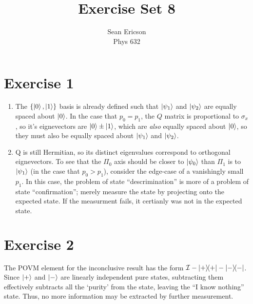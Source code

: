 \documentclass[12pt]{article}
\begin{document}
	
\title{Exercise Set 8}
\author{Sean Ericson \\ Phys 632}
\maketitle

\section*{Exercise 1}
\begin{enumerate}[label=(\alph*)]
    \item The $\{\ket{0}, \ket{1}\}$ basis is already defined such that $\ket{\psi_1}$ and $\ket{\psi_2}$ are equally spaced about $\ket{0}$. In the case that $p_0 = p_1$, the $Q$ matrix is proportional to $\sigma_x$, so it's eignevectors are $\ket{0}\pm\ket{1}$, which are \textit{also} equally spaced about $\ket{0}$, so they must also be equally spaced about $\ket{\psi_1}$ and $\ket{\psi_2}$.
    \item Q is still Hermitian, so its distinct eigenvalues correspond to orthogonal eignevectors. To see that the $\Pi_0$ axis should be closer to $\ket{\psi_0}$ than $\Pi_1$ is to $\ket{\psi_1}$ (in the case that $p_0 > p_1$), consider the edge-case of a vanishingly small $p_1$. In this case, the problem of state ``descrimination'' is more of a problem of state ``confirmation''; merely measure the state by projecting onto the expected state. If the measurment fails, it certianly was not in the expected state.
\end{enumerate}

\section*{Exercise 2}
The POVM element for the inconclusive result has the form $\mathcal{I} - \dyad{+} - \dyad{-}$. Since $\ket{+}$ and $\ket{-}$ are linearly independent pure states, subtracting them effectively subtracts all the `purity' from the state, leaving the ``I know nothing'' state. Thus, no more information may be extracted by further measurement.
\end{document}
